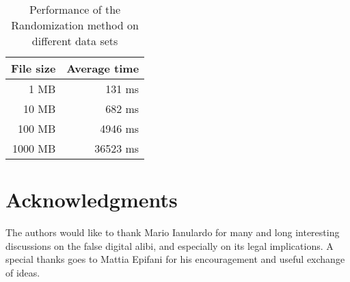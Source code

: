 \documentclass[conference]{IEEEtran}
\begin{document}
\begin{table}
\centering
\caption{Performance of the Randomization method on different data sets}
\begin{tabular}{ | r | r | }
\hline
\textbf{File size} & \textbf{Average time}\\
\hline
1 MB & 131 ms\\
\hline
10 MB & 682 ms\\
\hline
100 MB & 4946 ms\\
\hline
1000 MB & 36523 ms\\
\hline
\end{tabular}
\label{performance1}
\end{table}



\section*{Acknowledgments}
The authors would like to thank Mario Ianulardo for many and long interesting discussions on the false digital alibi, and especially on its legal implications. A special thanks goes to Mattia Epifani for his encouragement and useful exchange of ideas.



\end{document}
